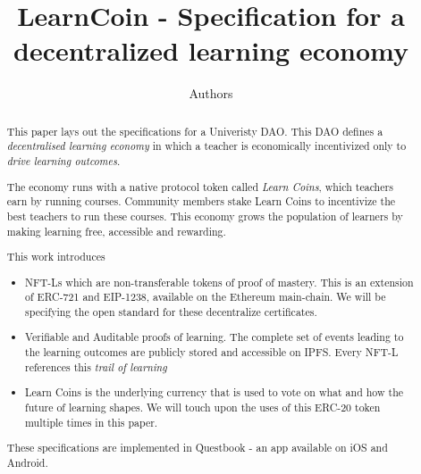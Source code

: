 \documentclass{article}
\author{Authors}
\title{LearnCoin - Specification for a decentralized learning economy}
\begin{document}
  \maketitle
  \begin{abstract}
    This paper lays out the specifications for a Univeristy DAO.
    This DAO defines a \textit{decentralised learning economy} in which a teacher is economically incentivized only to \textit{drive learning outcomes}.
    \par
    The economy runs  with a native protocol token called  \textit{Learn Coins}, which teachers earn by running courses. 
    Community members stake Learn Coins to incentivize the best teachers to run these courses.
    This economy grows the population of learners by making learning free, accessible and rewarding. %
    \par
    This work introduces
    \begin{itemize}
      \item NFT-Ls which are non-transferable tokens of proof of mastery. 
        This is an extension of ERC-721 and EIP-1238, available on the Ethereum main-chain. 
        We will be specifying the open standard for these decentralize certificates.
      \item Verifiable and Auditable proofs of learning. 
        The complete set of events leading to the learning outcomes are publicly stored and accessible on IPFS.
        Every NFT-L references this \textit{trail of learning}
      \item Learn Coins is the underlying currency that is used to vote on what and how the future of learning shapes. 
        We will touch upon the uses of this ERC-20 token multiple times in this paper.
    \end{itemize}
    \par
    These specifications are implemented in Questbook - an app available on iOS and Android.
  \end{abstract}
\end{document}
